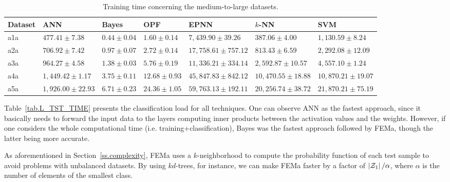 \begin{table*}[!htb]
\begin{center}
\caption{\label{tab.L_TR_TIME}Training time concerning the medium-to-large datasets.}
\scriptsize
\begin{tabular}{l||l|l|l|l|l|l}
Dataset & ANN   & Bayes  & OPF & EPNN & $k$-NN  & SVM     \\ \hline \hline
a1a& $ 477.41 \pm 7.38$& $ 0.44 \pm 0.04$& $ 1.60 \pm 0.14$& $ 7,439.90 \pm 39.26$& $ 387.06 \pm 4.00$& $ 1,130.59 \pm 8.24$ \\ 
a2a& $ 706.92 \pm 7.42$& $ 0.97 \pm 0.07$& $ 2.72 \pm 0.14$& $ 17,758.61 \pm 757.12$& $ 813.43 \pm 6.59$& $ 2,292.08 \pm 12.09$ \\ 
a3a& $ 964.27 \pm 4.58$& $ 1.38 \pm 0.03$& $ 5.76 \pm 0.19$& $ 11,336.21 \pm 334.14$& $ 2,592.87 \pm 10.57$& $ 4,557.10 \pm 1.24$ \\ 
a4a& $ 1,449.42 \pm 1.17$& $ 3.75 \pm 0.11$& $ 12.68 \pm 0.93$& $ 45,847.83 \pm 842.12$& $ 10,470.55 \pm 18.88$& $ 10,870.21 \pm 19.07$ \\ 
a5a& $ 1,926.00 \pm 22.93$& $ 6.71 \pm 0.23$& $ 24.36 \pm 1.05$& $ 59,763.13 \pm 192.11$& $ 20,256.74 \pm 38.72$ & $ 21,870.21 \pm 75.19$ \\ \hline
\end{tabular}
\end{center}
\end{table*}

Table~\ref{tab.L_TST_TIME} presents the classification load for all techniques. One can observe ANN as the fastest approach, since it basically needs to forward the input data to the layers computing inner products between the activation values and the weights. However, if one considers the whole computational time (i.e. training+classification), Bayes was the fastest approach followed by FEMa, though the latter being more accurate.

As aforementioned in Section~\ref{ss.complexity}, FEMa uses a $k$-neighborhood to compute the probability function of each test sample to avoid problems with unbalanced datasets. By using $kd$-trees, for instance, we can make FEMa faster by a factor of $\left|{\cal Z}_1\right|/\alpha$, where $\alpha$ is the number of elements of the smallest class.

